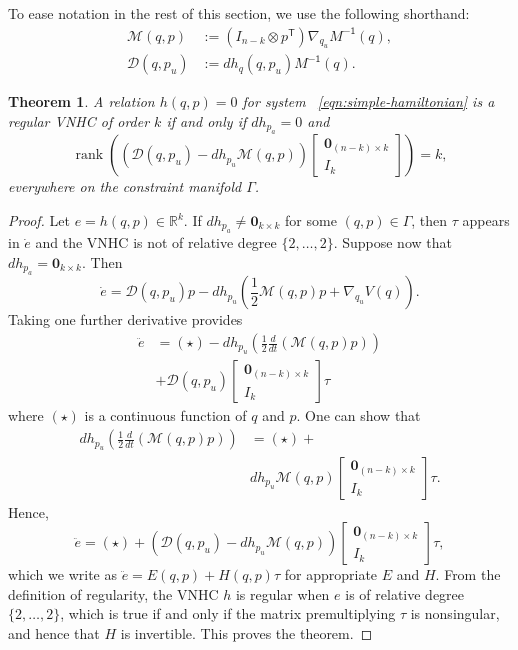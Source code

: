 \documentclass[journal,twoside,web]{ieeecolor}
\newtheorem{thm}{Theorem}%
\DeclareMathOperator{\Rank}{rank}
\newcommand*{\rank}[1]{\Rank\left(#1\right)}
\newcommand*{\tpose}{^\mathsf{T}}
\newcommand*{\R}{\mathbb{R}}
\newcommand*{\Minv}{M^\mathsf{-1}}
\newcommand*{\Id}[1]{I_{#1}}
\newcommand*{\Zmat}[1]{\bm{0}_{#1}}
\newcommand*{\diff}[2]{\frac{d #1}{d #2}}
\newcommand*{\simpleB}{\begin{bmatrix}\Zmat{(n-k)\times k}\\ \Id{k}\end{bmatrix}}
\begin{document}
To ease notation in the rest of this section, we use the following shorthand:
\begin{align}
    \mathcal{M}(q,p) &:= (\Id{n-k} \otimes p\tpose)\nabla_{q_u}\Minv(q) 
        ,\\
    \mathcal{D}(q,p_u) &:= dh_q(q,p_u) \Minv(q) 
    .
\end{align}

\begin{thm}\label{thm:vnhc-regularity}
    A relation \(h(q,p) = 0\) for system ~\eqref{eqn:simple-hamiltonian}
    is a regular VNHC of order \(k\) if and only if \(dh_{p_a} = 0\) 
    and
    \[
        \rank{\left(\mathcal{D}(q,p_u) - dh_{p_u}\mathcal{M}(q,p)\right)\simpleB} = k
         ,
    \]
    everywhere on the constraint manifold \(\Gamma\).
\end{thm}
\begin{proof}
    Let \(e = h(q,p) \in \R^k\).
    If \(dh_{p_a} \neq \Zmat{k\times k}\) for some \((q,p) \in \Gamma\), 
    then \(\tau\) appears in \(\dot{e}\) and the VNHC is not of relative degree
    \(\{2,\ldots,2\}\). Suppose now that \(dh_{p_a} = \Zmat{k\times k}\).
    Then 
    \[
        \dot{e} = \mathcal{D}(q,p_u)p - 
        dh_{p_u}\left(\frac{1}{2}\mathcal{M}(q,p)p + \nabla_{q_u}V(q)\right)
        .
    \]
    Taking one further derivative provides
    \begin{align*}
        \ddot{e} 
            &= (\star) - 
            dh_{p_u}\left(\frac{1}{2}\diff{}{t}\left(\mathcal{M}(q,p)p\right)\right) 
                \\
            &+ \mathcal{D}(q,p_u)\simpleB \tau
    \end{align*}
    where \((\star)\) is a continuous function of \(q\) and \(p\).
    One can show that
    \begin{align*}
        dh_{p_u}\left(\frac{1}{2}\diff{}{t}\left(\mathcal{M}(q,p)p\right)\right)
        &= (\star) +\\
        &dh_{p_u} \mathcal{M}(q,p)\simpleB \tau
        .
    \end{align*}
    Hence,
    \[
       \ddot{e} = (\star) +
       \left(\mathcal{D}(q,p_u) - dh_{p_u}\mathcal{M}(q,p)\right) \simpleB \tau
        ,
    \]
    which we write as \( \ddot{e} = E(q,p) + H(q,p)\tau\) for appropriate \(E\)
    and \(H\).
    From the definition of regularity, the VNHC \(h\) is regular 
    when \(e\) is of relative degree \(\{2,\ldots,2\}\), which is true 
    if and only if the matrix premultiplying \(\tau\) is nonsingular, and hence
    that \(H\) is invertible. This proves the theorem.
\end{proof}
\end{document}
